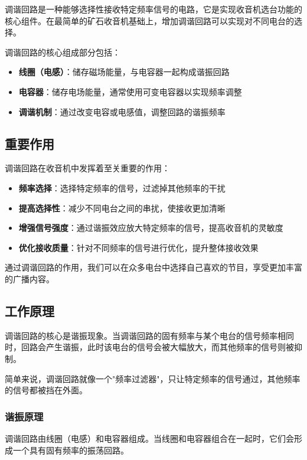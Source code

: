 \documentclass[12pt,UTF8]{ctexbook}
\begin{document}
调谐回路是一种能够选择性接收特定频率信号的电路，它是实现收音机选台功能的核心组件。在最简单的矿石收音机基础上，增加调谐回路可以实现对不同电台的选择。

调谐回路的核心组成部分包括：

\begin{itemize}[leftmargin=3.5em]
    \item \textbf{线圈（电感）}：储存磁场能量，与电容器一起构成谐振回路
    \item \textbf{电容器}：储存电场能量，通常使用可变电容器以实现频率调整
    \item \textbf{调谐机制}：通过改变电容或电感值，调整回路的谐振频率
\end{itemize}

\subsection{重要作用}

调谐回路在收音机中发挥着至关重要的作用：

\begin{itemize}[leftmargin=3.5em]
    \item \textbf{频率选择}：选择特定频率的信号，过滤掉其他频率的干扰
    \item \textbf{提高选择性}：减少不同电台之间的串扰，使接收更加清晰
    \item \textbf{增强信号强度}：通过谐振效应放大特定频率的信号，提高收音机的灵敏度
    \item \textbf{优化接收质量}：针对不同频率的信号进行优化，提升整体接收效果
\end{itemize}

通过调谐回路的作用，我们可以在众多电台中选择自己喜欢的节目，享受更加丰富的广播内容。

\subsection{工作原理}

调谐回路的核心是谐振现象。当调谐回路的固有频率与某个电台的信号频率相同时，回路会产生谐振，此时该电台的信号会被大幅放大，而其他频率的信号则被抑制。

简单来说，调谐回路就像一个"频率过滤器"，只让特定频率的信号通过，其他频率的信号都被挡在外面。

\subsubsection{谐振原理}

调谐回路由线圈（电感）和电容器组成。当线圈和电容器组合在一起时，它们会形成一个具有固有频率的振荡回路。
\end{document}
